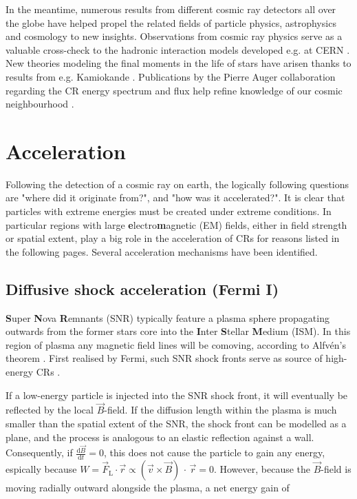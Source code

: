 In the meantime, numerous results from different cosmic ray detectors all over the globe have helped propel the related fields of particle physics, astrophysics 
and cosmology to new insights. Observations from cosmic ray physics serve as a valuable cross-check to the hadronic interaction models developed e.g. at CERN 
\cite{ostapchenko2007status}. New theories modeling the final moments in the life of stars have arisen thanks to results from e.g. Kamiokande 
\cite{goldman1988implications}. Publications by the Pierre Auger collaboration regarding the CR energy spectrum and flux help refine knowledge of our cosmic 
neighbourhood \cite{abraham2010measurement, aab2015searches}.

\section{Acceleration}
\label{sec:cr-acceleration}

Following the detection of a cosmic ray on earth, the logically following questions are "where did it originate from?", and "how was it accelerated?". It is clear 
that particles with extreme energies must be created under extreme conditions. In particular regions with large \textbf{e}lectro\textbf{m}agnetic (EM) fields, either 
in field strength or spatial extent, play a big role in the acceleration of CRs for reasons listed in the following pages. Several acceleration mechanisms have 
been identified.

\subsection{Diffusive shock acceleration (Fermi I)}
\label{ssec:cr-fermi-i}

\textbf{S}uper \textbf{N}ova \textbf{R}emnants (SNR) typically feature a plasma sphere propagating outwards from the former stars core into the 
\textbf{I}nter \textbf{S}tellar \textbf{M}edium (ISM). In this region of plasma any magnetic field lines will be comoving, according to Alfvén's theorem 
\cite{alfven1942existence}. First realised by Fermi, such SNR shock fronts serve as source of high-energy CRs \cite{fermi1949origin}.

If a low-energy particle is injected into the SNR shock front, it will eventually be reflected by the local $\vec{B}$-field. If the diffusion length within the
plasma is much smaller than the spatial extent of the SNR, the shock front can be modelled as a plane, and the process is analogous to an elastic reflection 
against a wall. Consequently, if $\frac{\text{d}\vec{B}}{\text{d}t} = 0$, this does not cause the particle to gain any energy, espically because 
$W = \vec{F}_\text{L} \cdot \vec{r} \propto (\vec{v}\times\vec{B})\,\cdot\,\vec{r} = 0$. However, because the $\vec{B}$-field is moving radially outward alongside 
the plasma, a net energy gain of 


